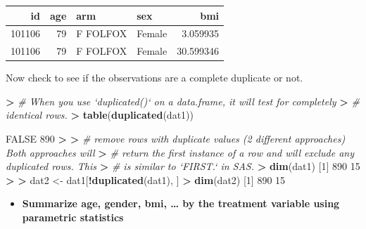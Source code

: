 \documentclass[
]{book}
\newenvironment{Shaded}{\begin{snugshade}}{\end{snugshade}}
\newcommand{\CommentTok}[1]{\textcolor[rgb]{0.56,0.35,0.01}{\textit{#1}}}
\newcommand{\DecValTok}[1]{\textcolor[rgb]{0.00,0.00,0.81}{#1}}
\newcommand{\ErrorTok}[1]{\textcolor[rgb]{0.64,0.00,0.00}{\textbf{#1}}}
\newcommand{\KeywordTok}[1]{\textcolor[rgb]{0.13,0.29,0.53}{\textbf{#1}}}
\newcommand{\NormalTok}[1]{#1}
\newcommand{\OperatorTok}[1]{\textcolor[rgb]{0.81,0.36,0.00}{\textbf{#1}}}
\newcommand{\OtherTok}[1]{\textcolor[rgb]{0.56,0.35,0.01}{#1}}
\newcommand{\StringTok}[1]{\textcolor[rgb]{0.31,0.60,0.02}{#1}}
\providecommand{\tightlist}{%
  \setlength{\itemsep}{0pt}\setlength{\parskip}{0pt}}
\begin{document}
\begin{Shaded}
\end{Shaded}

\begin{tabular}{r|r|l|l|r}
\hline
id & age & arm & sex & bmi\\
\hline
101106 & 79 & F FOLFOX & Female & 3.059935\\
\hline
101106 & 79 & F FOLFOX & Female & 30.599346\\
\hline
\end{tabular}

Now check to see if the observations are a complete duplicate or not.

\begin{Shaded}
\begin{Highlighting}[]
\OperatorTok{>}\StringTok{ }\CommentTok{# When you use `duplicated()` on a data.frame, it will test for completely}
\ErrorTok{>}\StringTok{ }\CommentTok{# identical rows.}
\ErrorTok{>}\StringTok{ }\KeywordTok{table}\NormalTok{(}\KeywordTok{duplicated}\NormalTok{(dat1))}

\OtherTok{FALSE} 
  \DecValTok{890} 
\OperatorTok{>}\StringTok{ }
\ErrorTok{>}\StringTok{ }\CommentTok{# remove rows with duplicate values (2 different approaches) Both approaches will}
\ErrorTok{>}\StringTok{ }\CommentTok{# return the first instance of a row and will exclude any duplicated rows.  This}
\ErrorTok{>}\StringTok{ }\CommentTok{# is similar to `FIRST.` in SAS.}
\ErrorTok{>}\StringTok{ }\KeywordTok{dim}\NormalTok{(dat1)}
\NormalTok{[}\DecValTok{1}\NormalTok{] }\DecValTok{890}  \DecValTok{15}
\OperatorTok{>}\StringTok{ }
\ErrorTok{>}\StringTok{ }\NormalTok{dat2 <-}\StringTok{ }\NormalTok{dat1[}\OperatorTok{!}\KeywordTok{duplicated}\NormalTok{(dat1), ]}
\OperatorTok{>}\StringTok{ }\KeywordTok{dim}\NormalTok{(dat2)}
\NormalTok{[}\DecValTok{1}\NormalTok{] }\DecValTok{890}  \DecValTok{15}
\end{Highlighting}
\end{Shaded}

\begin{itemize}
\tightlist
\item
  \textbf{Summarize age, gender, bmi, \ldots{} by the treatment variable using parametric statistics}
\end{itemize}
\end{document}
